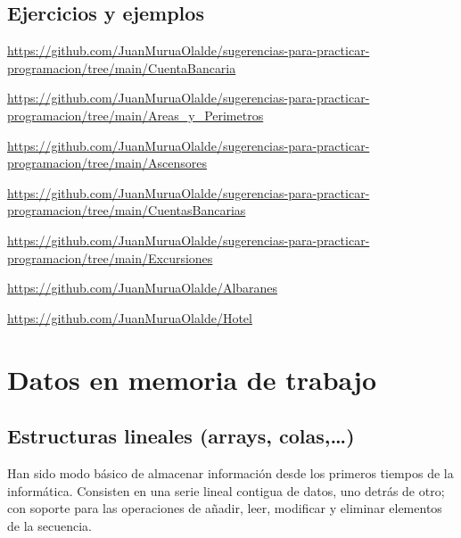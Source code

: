 \documentclass[spanish,12pt,a4paper,final,oneside]{book}
\begin{document}
\section{Ejercicios y ejemplos}

\url{https://github.com/JuanMuruaOlalde/sugerencias-para-practicar-programacion/tree/main/CuentaBancaria}

\url{https://github.com/JuanMuruaOlalde/sugerencias-para-practicar-programacion/tree/main/Areas_y_Perimetros}

\url{https://github.com/JuanMuruaOlalde/sugerencias-para-practicar-programacion/tree/main/Ascensores}

\url{https://github.com/JuanMuruaOlalde/sugerencias-para-practicar-programacion/tree/main/CuentasBancarias}

\url{https://github.com/JuanMuruaOlalde/sugerencias-para-practicar-programacion/tree/main/Excursiones}

\url{https://github.com/JuanMuruaOlalde/Albaranes}

\url{https://github.com/JuanMuruaOlalde/Hotel}






\chapter{Datos en memoria de trabajo}


\section{Estructuras lineales (arrays, colas,\ldots)}
Han sido modo básico de almacenar información desde los primeros tiempos de la informática. Consisten en una serie lineal contigua de datos, uno detrás de otro; con soporte para las operaciones de añadir, leer, modificar y eliminar elementos de la secuencia.
\end{document}
